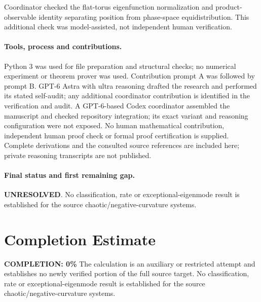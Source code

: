 \documentclass[11pt]{article}
\begin{document}
Coordinator checked the flat-torus eigenfunction normalization and product-observable identity separating position from phase-space equidistribution. This additional check was model-assisted, not independent human verification.

\paragraph{Tools, process and contributions.}
Python 3 was used for file preparation and structural checks; no numerical experiment or theorem prover was used. Contribution prompt A was followed by prompt B. GPT-6 Astra with ultra reasoning drafted the research and performed its stated self-audit; any additional coordinator contribution is identified in the verification and audit. A GPT-6-based Codex coordinator assembled the manuscript and checked repository integration; its exact variant and reasoning configuration were not exposed. No human mathematical contribution, independent human proof check or formal proof certification is supplied. Complete derivations and the consulted source references are included here; private reasoning transcripts are not published.

\paragraph{Final status and first remaining gap.}
\textbf{UNRESOLVED}. No classification, rate or exceptional-eigenmode result is established for the source chaotic/negative-curvature systems.

\section{Completion Estimate}
\noindent\textbf{COMPLETION: 0\%}
The calculation is an auxiliary or restricted attempt and establishes no newly verified portion of the full source target. No classification, rate or exceptional-eigenmode result is established for the source chaotic/negative-curvature systems.
\end{document}
